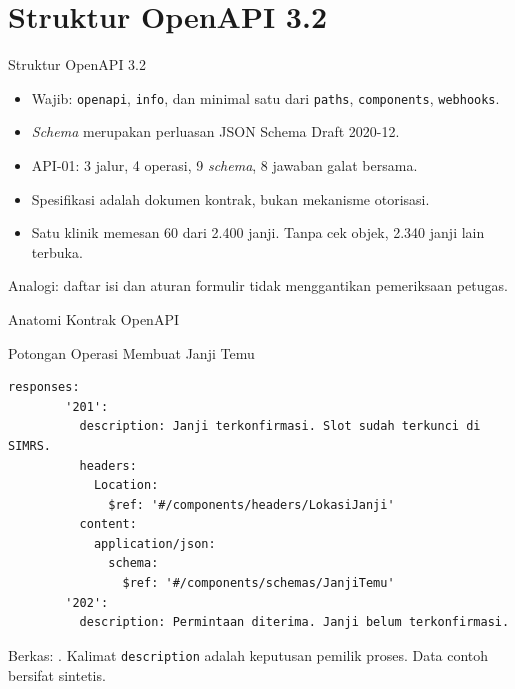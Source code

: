 \documentclass[aspectratio=169, table, 12pt]{beamer}
\begin{document}
\section{Struktur OpenAPI 3.2}

\begin{frame}{{\Large Struktur OpenAPI 3.2}}
  \vspace{8pt}
  \begin{itemize}
    \item Wajib: \texttt{openapi}, \texttt{info}, dan minimal satu dari \texttt{paths}, \texttt{components}, \texttt{webhooks}.
    \item \textit{Schema} merupakan perluasan JSON Schema Draft 2020-12.
    \item API-01: 3 jalur, 4 operasi, 9 \textit{schema}, 8 jawaban galat bersama.
    \item Spesifikasi adalah dokumen kontrak, bukan mekanisme otorisasi.
    \item Satu klinik memesan 60 dari 2.400 janji. Tanpa cek objek, 2.340 janji lain terbuka.
  \end{itemize}
  \vspace{6pt}
  {\small Analogi: daftar isi dan aturan formulir tidak menggantikan pemeriksaan petugas.}
\end{frame}

\begin{frame}{{\Large Anatomi Kontrak OpenAPI}}
  \centering
\end{frame}

\begin{frame}[fragile]{{\Large Potongan Operasi Membuat Janji Temu}}
\begin{lstlisting}[style=ch09yaml]
      responses:
        '201':
          description: Janji terkonfirmasi. Slot sudah terkunci di SIMRS.
          headers:
            Location:
              $ref: '#/components/headers/LokasiJanji'
          content:
            application/json:
              schema:
                $ref: '#/components/schemas/JanjiTemu'
        '202':
          description: Permintaan diterima. Janji belum terkonfirmasi.
\end{lstlisting}

  \vspace{4pt}
  \small Berkas: . Kalimat \texttt{description} adalah keputusan pemilik proses. Data contoh bersifat sintetis.
\end{frame}
\end{document}
